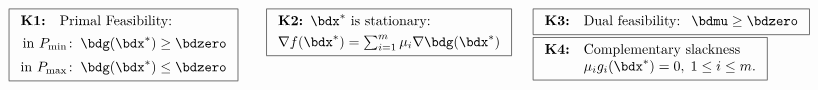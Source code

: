 \documentclass[a4paper]{article}
\begin{document}
\begin{itemize}
    \[
        \boxed{
        \begin{array}[t]{rl}
        \textbf{K1:}
        & \text{Primal Feasibility:} \\[4pt]
        \multicolumn{2}{r}{\text{in}~P_{\min}\!:\; \bdg(\bdx^*)\ge\bdzero} \\[5pt]
        \multicolumn{2}{r}{\text{in}~P_{\max}\!:\; \bdg(\bdx^*)\le\bdzero} \\
        \end{array}}
        \hspace{2em}
        \boxed{
        \begin{array}[t]{l}
        \textbf{K2: }
        \bdx^*~\text{is stationary:} \\[3pt]
         \nabla f(\bdx^*)=\sum_{i=1}^m\mu_i\nabla\bdg(\bdx^*) \\
        \end{array}}
        \hspace{1em}
        \begin{array}[t]{l}
          \boxed{
            \begin{array}[t]{rl}
              \textbf{K3:} & \text{Dual feasibility: }~\bdmu \ge \bdzero
          \end{array}}
          \\[5pt]
          \boxed{
            \begin{array}[t]{rl}
              \textbf{K4:}&\text{Complementary slackness} \\
                          &\mu_ig_i(\bdx^*) = 0,\; 1\le i\le m.
          \end{array}}
        \end{array}
    \]
 \end{itemize}

\end{document}

